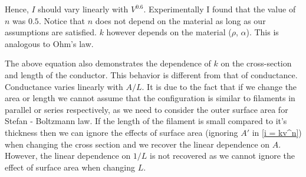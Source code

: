 \documentclass[titlepage, a4paper, 11pt]{article}
\begin{document}
Hence, $I$ should vary linearly with $V^{0.6}$. Experimentally I found that the value of $n$ was
$0.5$. Notice that $n$ does not depend on the material as long as our assumptions are satisfied. $k$
however depends on the material ($\rho$, $\alpha$). This is analogous to Ohm's law.

The above equation also demonstrates the dependence of $k$ on the cross-section and length of the
conductor. This behavior is different from that of conductance. Conductance varies linearly with
$A/L$. It is due to the fact that if we change the area or length we cannot assume that
the configuration is similar to filaments in parallel or series respectively, as we need to
consider the outer surface area for Stefan - Boltzmann law. If the length of the filament is
small compared to it's thickness then we can ignore the effects of surface area (ignoring $A'$ in
\eqref{i = kv^n}) when changing the cross section and we recover the linear dependence on $A$.
However, the linear dependence on $1/L$ is not recovered as we cannot ignore the effect of surface
area when changing $L$.
\end{document}
